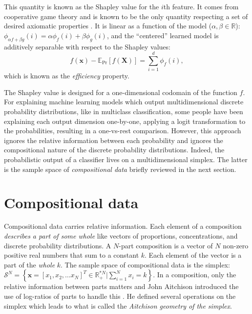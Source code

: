 \documentclass{article}
\theoremstyle{plain}
\theoremstyle{definition}
\theoremstyle{remark}
\begin{document}
This quantity is known as the Shapley value for the $i$th feature. It comes from cooperative game theory and is known to be the only quantity respecting a set of desired axiomatic properties \cite{shapley1953value}. It is linear as a function of the model ($\alpha, \beta \in \mathbb{R}$): $\phi_{\alpha f +\beta g}(i) = \alpha \phi_f(i) + \beta \phi_g(i)$, and the ``centered'' learned model is additively separable with respect to the Shapley values:
\begin{equation}
  f(\bm{x})-\mathbb{E}_{\text{Pr}}[f(\bm{X})] = \sum_{i=1}^{d} \phi_f(i),
\end{equation}
which is known as the \emph{efficiency} property.

The Shapley value is designed for a one-dimensional codomain of the function $f$. For explaining machine learning models which output multidimensional discrete probability distributions, like in multiclass classification, some people have been explaining each output dimension one-by-one, applying a logit transformation to the probabilities, resulting in a one-vs-rest comparison. However, this approach ignores the relative information between each probability and ignores the compositional nature of the discrete probability distributions. Indeed, the probabilistic output of a classifier lives on a multidimensional simplex. The latter is the sample space of \emph{compositional data} briefly reviewed in the next section.

\section{Compositional data}
\label{sec:compo}

Compositional data carries relative information. Each element of a composition \emph{describes a part of some whole} \cite{pawlowskymodeling} like vectors of proportions, concentrations, and discrete probability distributions. A $N$-part composition is a vector of $N$ non-zero positive real numbers that sum to a constant $k$. Each element of the vector is a part of the \emph{whole} $k$. The sample space of compositional data is the simplex: $\mathcal{S}^N = \left\{ \bm{x} = [x_1, x_2,\dots x_{N}]^T \in \mathbb{R}^{*N}_{+} \big| \sum_{i=1}^{N} x_i = k \right\}$. In a composition, only the relative information between parts matters and John Aitchison introduced the use of log-ratios of parts to handle this \cite{aitchison1982}. He defined several operations on the simplex which leads to what is called the \emph{Aitchison geometry of the simplex}.
\end{document}
